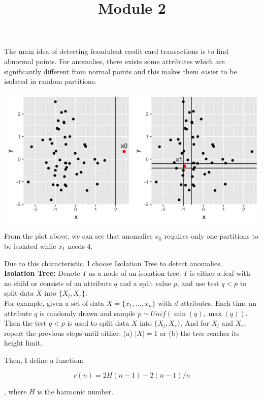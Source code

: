 \documentclass[11pt,a4paper]{article}
\title{Module 2}
\date{}
\begin{document}
\maketitle

The main idea of detecting fraudulent credit card transactions is to find abnormal points. For anomalies, there exists some attributes 
which are significantly different from normal points and this makes them easier to be isolated in random partitions. 

\includegraphics[width=\linewidth]{../figure/Rplot1.png}

From the plot above, we can see that anomalies $x_0$ requires only one partitions to be isolated while $x_1$ needs 4.

Due to this characteristic, I choose Isolation Tree to detect anomalies.\\

\noindent\textbf{Isolation Tree:} Denote $T$ as a node of an isolation tree. $T$ is either a leaf with no child or consists of an attribute $q$ 
and a split value $p$, and use test $q<p$ to split data $X$ into $\{X_l, X_r\}$.\\

For example, given a set of data $X = \{x_1,\dots,x_n\}$ with $d$ attributes. Each time an attribute $q$ is randomly drawn and sample 
$p\sim Unif(\min(q),\max(q))$. Then the test $q<p$ is used to split data $X$ into $\{X_l, X_r\}$. And for $X_l$ and $X_r$, repeat the 
previous steps until either: (a) $|X| = 1$ or (b) the tree reaches its height limit.

Then, I define a function:

\begin{equation}\label{c}
    c(n) =  2H(n-1) - 2(n-1)/n
\end{equation}

\noindent , where $H$ is the harmonic number.\\
\end{document}
